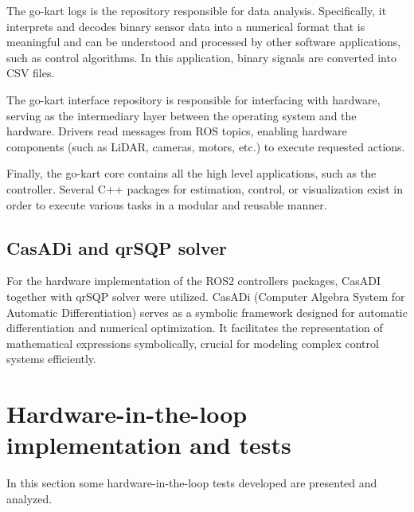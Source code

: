 \documentclass[a4paper,12pt,oneside]{book}
\begin{document}
The go-kart logs is the repository responsible for data analysis. 
Specifically, it interprets and decodes binary sensor data into a numerical format that is meaningful and can be understood and processed by other software applications, such as control algorithms.
In this application, binary signals are converted into CSV files.

The go-kart interface repository is responsible for interfacing with hardware, serving as the intermediary layer between the operating system and the hardware. 
Drivers read messages from ROS topics, enabling hardware components (such as LiDAR, cameras, motors, etc.) to execute requested actions.

Finally, the go-kart core contains all the high level applications, such as the controller. 
Several C++ packages for estimation, control, or visualization exist in order to execute various tasks in a modular and reusable manner.

\subsection*{CasADi and qrSQP solver}
For the hardware implementation of the ROS2 controllers packages, CasADI together with qrSQP solver were utilized.
CasADi (Computer Algebra System for Automatic Differentiation) \cite{Andersson2018} serves as a symbolic framework designed for automatic differentiation and numerical optimization.
It facilitates the representation of mathematical expressions symbolically, crucial for modeling complex control systems efficiently.


\section{Hardware-in-the-loop implementation and tests}
In this section some hardware-in-the-loop tests developed are presented and analyzed.
\end{document}
